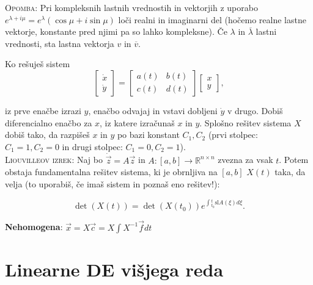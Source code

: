 \documentclass[8pt,a4paper]{amsart}
\theoremstyle{definition} %
\theoremstyle{plain} %
\let\oldint\int
\renewcommand{\int}{\oldint \!}
\newcommand{\R}{\mathbb R}
\begin{document}
\textsc{Opomba:} Pri kompleksnih lastnih vrednostih in vektorjih z uporabo
$e^{\lambda + i\mu} = e^{\lambda}(\cos{\mu}+i\sin{\mu})$ loči realni in
imaginarni del (hočemo realne lastne vektorje, konstante pred njimi pa so lahko
kompleksne). Če $\lambda$ in $\overline{\lambda}$ lastni vrednosti, sta lastna vektorja $v$ in $\overline{v}$.

%
%
Ko rešuješ sistem
\vspace{-0.3cm}
$$
\begin{bmatrix} \dot{x} \\ \dot{y} \end{bmatrix} =
\begin{bmatrix} a(t) & b(t) \\ c(t) & d(t) \end{bmatrix}
\begin{bmatrix} x \\ y \end{bmatrix},
$$

iz prve enačbe izrazi $y$, enačbo odvajaj in vstavi dobljeni $\dot{y}$ v drugo. Dobiš diferencialno enačbo za $x$, iz katere izračunaš $x$ in $y$. Splošno rešitev sistema $X$ dobiš tako, da razpišeš $x$ in $y$ po bazi konstant $C_1,C_2$ (prvi stolpec: $C_1 = 1, C_2 = 0$ in drugi stolpec: $C_1 = 0, C_2 = 1$).
\\

\vspace{-0.3cm}
\textsc{Liouvilleov izrek: }Naj bo $\dot{\vec{z}} = A \vec{z}$ in $A:[a,b] \rightarrow \R^{n\times n}$ zvezna za vsak $t$. Potem obstaja fundamentalna rešitev sistema, ki je obrnljiva na $[a,b]$ $X(t)$ taka, da velja (to uporabiš, če imaš sistem in poznaš eno rešitev!):

\vspace{-0.4cm}
$$
\det{(X(t))} = \det{(X(t_0))}e^{\int_{t_0}^t \text{sl}A(\xi)d\xi}.
$$

\vspace{-0.2cm}
\textbf{Nehomogena}: $\vec{x} = X\vec{c} = X \int X^{-1}\vec{f}dt$

\section*{\textbf{Linearne DE višjega reda}}  %
\end{document}
